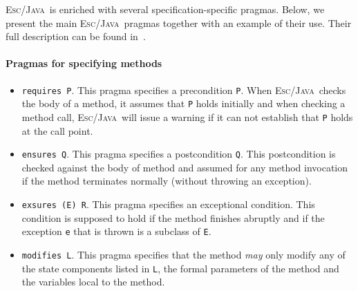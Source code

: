 \documentclass[a4paper]{llncs}
\newcommand{\escj}{\textsc{Esc/Java}}
\begin{document}
\escj~is enriched with several
specification-specific pragmas. Below, we present
the main \escj~pragmas together with an example of their
use. Their full description can be found in~\cite{LeinoNS00}. 




\paragraph{\bf Pragmas for specifying methods} 
\begin{itemize}
\item{\texttt{requires P}.} 
This pragma specifies a precondition {\tt P}. 
When \escj~checks the body of a
method, it assumes that \texttt{P} holds initially and when checking
a method call, \escj~will issue a warning if 
it can not establish that \texttt{P} holds at the call point. 
 
\item{\texttt{ensures Q}.} 
This pragma specifies a postcondition \texttt{Q}. This postcondition
is checked against the body of method and assumed for any method
invocation if the method terminates normally (without throwing an
exception).
 
\item{\texttt{exsures (E) R}.}
This pragma specifies an exceptional condition. This condition is 
supposed to hold if the method finishes abruptly and if
the exception \texttt{e} that is thrown is a subclass of \texttt{E}. 
 
\item{\texttt{modifies L}.} 
This pragma specifies that the method \emph{may} only modify any of 
the state components listed in \texttt{L}, the formal parameters of 
the method and the variables local to the method. 
\end{itemize}
 
 
 
\end{document}
